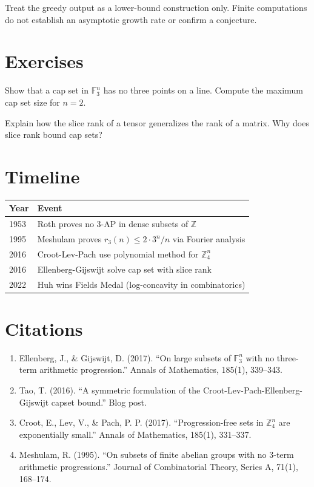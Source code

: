 \begin{highlightbox}
Treat the greedy output as a lower-bound construction only. Finite computations do not establish an asymptotic growth rate or confirm a conjecture.
\end{highlightbox}

\section{Exercises}

\begin{exercise}[Basic]
Show that a cap set in $\mathbb{F}_3^n$ has no three points on a line. Compute the maximum cap set size for $n=2$.
\end{exercise}

\begin{exercise}[Intermediate]
Explain how the slice rank of a tensor generalizes the rank of a matrix. Why does slice rank bound cap sets?
\end{exercise}

\section{Timeline}

\begin{tabularx}{\linewidth}{lX}
\toprule
\textbf{Year} & \textbf{Event} \\ \midrule
1953 & Roth proves no 3-AP in dense subsets of $\mathbb{Z}$ \\
1995 & Meshulam proves $r_3(n) \le 2 \cdot 3^n / n$ via Fourier analysis \\
2016 & Croot-Lev-Pach use polynomial method for $\mathbb{Z}_4^n$ \\
2016 & Ellenberg-Gijswijt solve cap set with slice rank \\
2022 & Huh wins Fields Medal (log-concavity in combinatorics) \\
\bottomrule
\end{tabularx}

\section{Citations}

\begin{enumerate}
\item Ellenberg, J., \& Gijswijt, D. (2017). ``On large subsets of $\mathbb{F}_3^n$ with no three-term arithmetic progression.'' Annals of Mathematics, 185(1), 339--343.
\item Tao, T. (2016). ``A symmetric formulation of the Croot-Lev-Pach-Ellenberg-Gijswijt capset bound.'' Blog post.
\item Croot, E., Lev, V., \& Pach, P. P. (2017). ``Progression-free sets in $\mathbb{Z}_4^n$ are exponentially small.'' Annals of Mathematics, 185(1), 331--337.
\item Meshulam, R. (1995). ``On subsets of finite abelian groups with no 3-term arithmetic progressions.'' Journal of Combinatorial Theory, Series A, 71(1), 168--174.
\end{enumerate}
